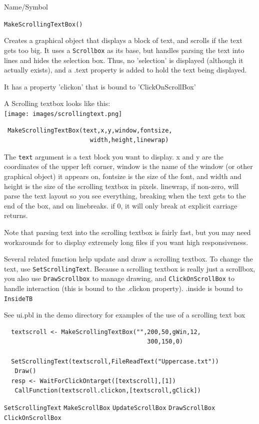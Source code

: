 \begin{desc}{Name/Symbol}
\item[Name/Symbol]  	\verb+MakeScrollingTextBox()+

\item[Description]	
Creates a graphical object that displays a block of text, and scrolls if the text gets too big. It uses a \verb+Scrollbox+ as its base, but handles parsing the text into lines and hides the selection box.  Thus, no 'selection' is displayed (although it actually exists), and a .text property is added to hold the text being displayed.

It has a property 'clickon' that is bound to 'ClickOnScrollBox'

A Scrolling textbox looks like this:\\
 \texttt{[image: images/scrollingtext.png]}

\item[Usage]
\begin{verbatim}
 MakeScrollingTextBox(text,x,y,window,fontsize,
                        width,height,linewrap)
 \end{verbatim}

The \texttt{text} argument is a text block you want to display. x and y are the coordinates of the upper left corner, window is the name of the window (or other graphical object) it appears on, fontsize is the size of the font, and width and height is the size of the scrolling textbox in pixels.  linewrap, if non-zero, will parse the text layout so you see everything, breaking when the text gets to the end of the box, and on linebreaks.  if 0, it will only break at explicit carriage returns.

Note that parsing text into the scrolling textbox is fairly fast, but you may need workarounds for to display extremely long files if you want high responsiveness.

Several related function help update and draw a scrolling textbox.  To change the text, use \verb+SetScrollingText+. Because a scrolling textbox is really just a scrollbox, you also use \verb+DrawScrollbox+ to manage drawing, and \verb+ClickOnScrollBox+ to handle interaction (this is bound to the .clickon property). .inside is bound to \verb+InsideTB+


\item[Example]      	
See ui.pbl in the demo directory for examples of the use of a scrolling text box


\begin{verbatim}
  textscroll <- MakeScrollingTextBox("",200,50,gWin,12,
                                        300,150,0)

  SetScrollingText(textscroll,FileReadText("Uppercase.txt"))
   Draw()
  resp <- WaitForClickOntarget([textscroll],[1])
   CallFunction(textscroll.clickon,[textscroll,gClick]) 
\end{verbatim}

\item[See Also]
\verb+SetScrollingText+
\verb+MakeScrollBox+
\verb+UpdateScrollBox+
\verb+DrawScrollBox+
\verb+ClickOnScrollBox+
\end{desc}



